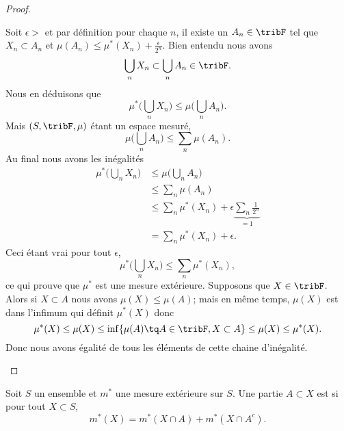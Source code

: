 \begin{proof}
\begin{subproof}
		Soit \( \epsilon>\) et par définition pour chaque \( n\), il existe un \( A_n\in \tribF\) tel que \( X_n\subset A_n\) et \( \mu(A_n)\leq \mu^*(X_n)+\frac{ \epsilon }{ 2^n }\). Bien entendu nous avons
		\begin{equation}
			\bigcup_nX_n\subset \bigcup_nA_n\in\tribF.
		\end{equation}
		Nous en déduisons que
		\begin{equation}
			\mu^*\big( \bigcup_nX_n \big)\leq\mu\big( \bigcup_nA_n \big).
		\end{equation}
		Mais \( (S,\tribF,\mu)\) étant un espace mesuré,
		\begin{equation}
			\mu\big( \bigcup_nA_n \big)\leq \sum_n\mu(A_n).
		\end{equation}
		Au final nous avons les inégalités
		\begin{subequations}
			\begin{align}
				\mu^*\big( \bigcup_nX_n \big) & \leq  \mu\big( \bigcup_nA_n \big)                                       \\
				                              & \leq  \sum_n\mu(A_n)                                                    \\
				                              & \leq  \sum_n\mu^*(X_n)+\epsilon\underbrace{ \sum_n\frac{1}{ 2^n }}_{=1} \\
				                              & =   \sum_n\mu^*(X_n)+\epsilon.
			\end{align}
		\end{subequations}
		Ceci étant vrai pour tout \( \epsilon\),
		\begin{equation}
			\mu^*\big( \bigcup_nX_n \big)\leq\sum_n\mu^*(X_n),
		\end{equation}
		ce qui prouve que \( \mu^*\) est une mesure extérieure.
		\spitem[Restriction]
		Supposons que \( X\in\tribF\). Alors si \( X\subset A\) nous avons \( \mu(X)\leq \mu(A)\); mais en même temps, \( \mu(X)\) est dans l'infimum qui définit \( \mu^*(X)\) donc
		\begin{equation}
			\mu^*(X)\leq\mu(X)\leq \inf \{ \mu(A)\tq A\in\tribF,X\subset A \}\leq \mu(X)\leq\mu^*(X).
		\end{equation}
		Donc nous avons égalité de tous les éléments de cette chaine d'inégalité.
	\end{subproof}
\end{proof}

\begin{definition}  \label{DefTRBoorvnUY}
	Soit \( S\) un ensemble et \( m^*\) une mesure extérieure sur \( S\). Une partie \( A\subset X\) est  si pour tout \( X\subset S\),
	\begin{equation}
		m^*(X)=m^*(X\cap A)+m^*(X\cap A^c).
	\end{equation}
\end{definition}

